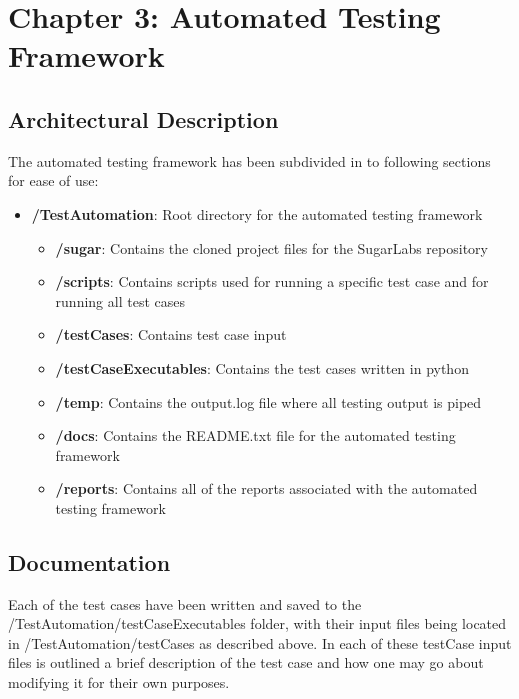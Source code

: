 \documentclass{article}
\begin{document}
\section{Chapter 3: Automated Testing Framework}
\subsection{Architectural Description}
The automated testing framework has been subdivided in to following sections for ease of use:
\begin{itemize}[noitemsep,topsep=0pt]
\item[]\textbf{/TestAutomation}: Root directory for the automated testing framework
\begin{itemize}[noitemsep,topsep=0pt]
\item[]\textbf{/sugar}: Contains the cloned project files for the SugarLabs repository
\item[]\textbf{/scripts}: Contains scripts used for running a specific test case and for running all test cases
\item[]\textbf{/testCases}: Contains test case input
\item[]\textbf{/testCaseExecutables}: Contains the test cases written in python
\item[]\textbf{/temp}: Contains the output.log file where all testing output is piped
\item[]\textbf{/docs}: Contains the README.txt file for the automated testing framework
\item[]\textbf{/reports}: Contains all of the reports associated with the automated testing framework
\end{itemize}
\end{itemize}
\subsection{Documentation}
Each of the test cases have been written and saved to the /TestAutomation/testCaseExecutables folder, with their input files being located in /TestAutomation/testCases as described above. In each of these testCase input files is outlined a brief description of the test case and how one may go about modifying it for their own purposes.
\end{document}
